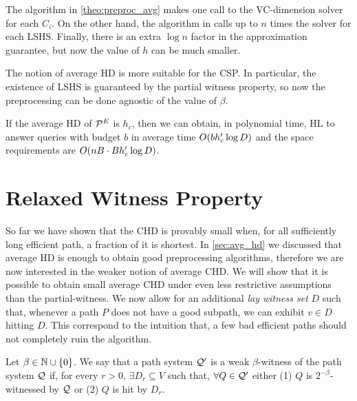 \documentclass[letterpaper,11pt]{article}
\begin{document}
\begin{remark}
The algorithm in \cref{theo:preproc_avg} makes one call to the VC-dimension solver for each $C_i$.
On the other hand, the algorithm in \cite{highway2013} calls up to $n$ times the solver for each LSHS.
Finally, there is an extra $\log n$ factor in the approximation guarantee, but now the value of $h$ can be much smaller.
\end{remark}

The notion of average HD is more suitable for the CSP.
In particular, the existence of LSHS is guaranteed by the partial witness property, so now the preprocessing can be done agnostic of the value of $\beta$.

\begin{theorem}
If the average HD of $\mathcal{P}^E$ is $h_c$, then we can obtain, in polynomial time, HL to answer queries with budget $b$ in average time $O(bh_c'\log D)$ and the space requirements are $O(nB\cdot Bh_c'\log D)$.
\end{theorem}

\section{Relaxed Witness Property}\label{sec:rel_witness}

So far we have shown that the CHD is provably small when, for all sufficiently long efficient path, a fraction of it is shortest.
In \cref{sec:avg_hd} we discussed that average HD is enough to obtain good preprocessing algorithms, therefore we are now interested in the weaker notion of average CHD.
We will show that it is possible to obtain small average CHD under even less restrictive assumptions than the partial-witness.
We now allow for an additional \emph{lay witness set} $D$ such that, whenever a path $P$ does not have a good subpath, we can exhibit $v\in D$ hitting $D$.
This correspond to the intuition that, a few bad efficient paths should not completely ruin the algorithm. 

\begin{definition}
Let $\beta\in\mathbb{N}\cup\{0\}$.
We say that a path system $\mathcal{Q}'$ is a weak $\beta$-witness of the path system $\mathcal{Q}$ if, for every $r>0$, $\exists D_r\subseteq V$ such that, $\forall Q\in \mathcal{Q}'$ either (1) $Q$ is $2^{-\beta}$-witnessed by $\mathcal{Q}$ or (2) $Q$ is hit by $D_r$.
\end{definition} 
\end{document}
